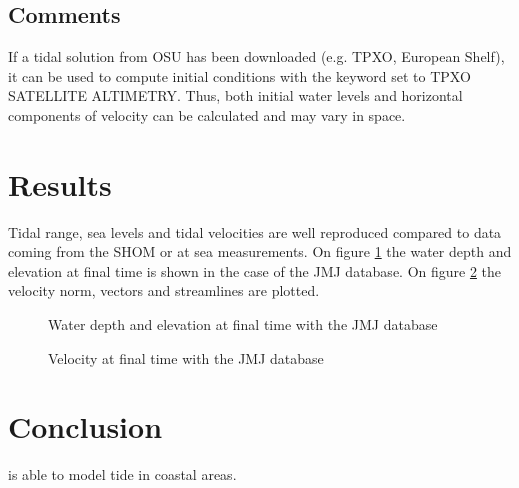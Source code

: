 \subsection{Comments}
%
If a tidal solution from OSU has been downloaded (e.g. TPXO, European
Shelf), it can be used to compute initial conditions with the keyword
 set to TPXO SATELLITE ALTIMETRY.
Thus, both initial water levels and horizontal components of velocity
can be calculated and may vary in space.
%
%
%
\section{Results}
%
Tidal range, sea levels and tidal velocities are well reproduced compared to
data coming from the SHOM or at sea measurements. On figure \ref{fig:tide:H} the water depth
and elevation at final time is shown in the case of the JMJ database.
On figure \ref{fig:tide:U} the velocity norm, vectors and streamlines are plotted.

\begin{figure}[!htbp]
\begin{minipage}[t]{0.5\textwidth}
 \centering
\end{minipage}%
\begin{minipage}[t]{0.5\textwidth}
 \centering
\end{minipage}
  \caption{Water depth and elevation at final time with the JMJ database}\label{fig:tide:H}
\end{figure}

\begin{figure}[H]
\begin{minipage}[t]{0.5\textwidth}
 \centering
\end{minipage}%
\begin{minipage}[t]{0.5\textwidth}
 \centering
\end{minipage}
  \caption{Velocity at final time with the JMJ database}\label{fig:tide:U}
\end{figure}


\section{Conclusion}
%
 is able to model tide in coastal areas.
%
%
